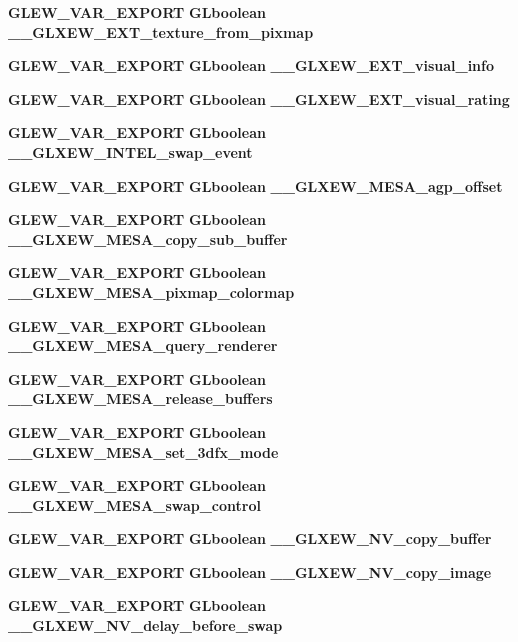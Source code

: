 \begin{DoxyCompactItemize}
{\bf G\+L\+E\+W\+\_\+\+V\+A\+R\+\_\+\+E\+X\+P\+O\+RT} {\bf G\+Lboolean} {\bf \+\_\+\+\_\+\+G\+L\+X\+E\+W\+\_\+\+E\+X\+T\+\_\+texture\+\_\+from\+\_\+pixmap}
\item 
{\bf G\+L\+E\+W\+\_\+\+V\+A\+R\+\_\+\+E\+X\+P\+O\+RT} {\bf G\+Lboolean} {\bf \+\_\+\+\_\+\+G\+L\+X\+E\+W\+\_\+\+E\+X\+T\+\_\+visual\+\_\+info}
\item 
{\bf G\+L\+E\+W\+\_\+\+V\+A\+R\+\_\+\+E\+X\+P\+O\+RT} {\bf G\+Lboolean} {\bf \+\_\+\+\_\+\+G\+L\+X\+E\+W\+\_\+\+E\+X\+T\+\_\+visual\+\_\+rating}
\item 
{\bf G\+L\+E\+W\+\_\+\+V\+A\+R\+\_\+\+E\+X\+P\+O\+RT} {\bf G\+Lboolean} {\bf \+\_\+\+\_\+\+G\+L\+X\+E\+W\+\_\+\+I\+N\+T\+E\+L\+\_\+swap\+\_\+event}
\item 
{\bf G\+L\+E\+W\+\_\+\+V\+A\+R\+\_\+\+E\+X\+P\+O\+RT} {\bf G\+Lboolean} {\bf \+\_\+\+\_\+\+G\+L\+X\+E\+W\+\_\+\+M\+E\+S\+A\+\_\+agp\+\_\+offset}
\item 
{\bf G\+L\+E\+W\+\_\+\+V\+A\+R\+\_\+\+E\+X\+P\+O\+RT} {\bf G\+Lboolean} {\bf \+\_\+\+\_\+\+G\+L\+X\+E\+W\+\_\+\+M\+E\+S\+A\+\_\+copy\+\_\+sub\+\_\+buffer}
\item 
{\bf G\+L\+E\+W\+\_\+\+V\+A\+R\+\_\+\+E\+X\+P\+O\+RT} {\bf G\+Lboolean} {\bf \+\_\+\+\_\+\+G\+L\+X\+E\+W\+\_\+\+M\+E\+S\+A\+\_\+pixmap\+\_\+colormap}
\item 
{\bf G\+L\+E\+W\+\_\+\+V\+A\+R\+\_\+\+E\+X\+P\+O\+RT} {\bf G\+Lboolean} {\bf \+\_\+\+\_\+\+G\+L\+X\+E\+W\+\_\+\+M\+E\+S\+A\+\_\+query\+\_\+renderer}
\item 
{\bf G\+L\+E\+W\+\_\+\+V\+A\+R\+\_\+\+E\+X\+P\+O\+RT} {\bf G\+Lboolean} {\bf \+\_\+\+\_\+\+G\+L\+X\+E\+W\+\_\+\+M\+E\+S\+A\+\_\+release\+\_\+buffers}
\item 
{\bf G\+L\+E\+W\+\_\+\+V\+A\+R\+\_\+\+E\+X\+P\+O\+RT} {\bf G\+Lboolean} {\bf \+\_\+\+\_\+\+G\+L\+X\+E\+W\+\_\+\+M\+E\+S\+A\+\_\+set\+\_\+3dfx\+\_\+mode}
\item 
{\bf G\+L\+E\+W\+\_\+\+V\+A\+R\+\_\+\+E\+X\+P\+O\+RT} {\bf G\+Lboolean} {\bf \+\_\+\+\_\+\+G\+L\+X\+E\+W\+\_\+\+M\+E\+S\+A\+\_\+swap\+\_\+control}
\item 
{\bf G\+L\+E\+W\+\_\+\+V\+A\+R\+\_\+\+E\+X\+P\+O\+RT} {\bf G\+Lboolean} {\bf \+\_\+\+\_\+\+G\+L\+X\+E\+W\+\_\+\+N\+V\+\_\+copy\+\_\+buffer}
\item 
{\bf G\+L\+E\+W\+\_\+\+V\+A\+R\+\_\+\+E\+X\+P\+O\+RT} {\bf G\+Lboolean} {\bf \+\_\+\+\_\+\+G\+L\+X\+E\+W\+\_\+\+N\+V\+\_\+copy\+\_\+image}
\item 
{\bf G\+L\+E\+W\+\_\+\+V\+A\+R\+\_\+\+E\+X\+P\+O\+RT} {\bf G\+Lboolean} {\bf \+\_\+\+\_\+\+G\+L\+X\+E\+W\+\_\+\+N\+V\+\_\+delay\+\_\+before\+\_\+swap}

\end{DoxyCompactItemize}
